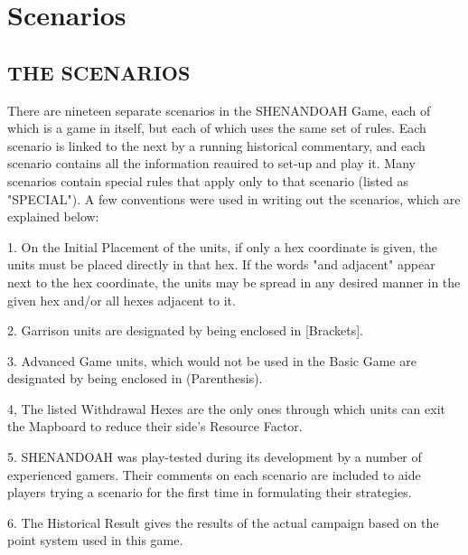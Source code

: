 \section{Scenarios}

\subsection*{THE SCENARIOS}

There are nineteen separate scenarios in the SHENANDOAH Game, each of which is
a game in itself, but each of which uses the same set of rules. Each scenario
is linked to the next by a running historical commentary, and each scenario
contains all the information reauired to set-up and play it. Many scenarios
contain special rules that apply only to that scenario (listed as "SPECIAL"). A
few conventions were used in writing out the scenarios, which are explained
below:

1. On the Initial Placement of the units, if only a hex coordinate is given,
the units must be placed directly in that hex. If the words "and adjacent"
appear next to the hex coordinate, the units may be spread in any desired
manner in the given hex and/or all hexes adjacent to it.

2. Garrison units are designated by being enclosed in [Brackets].

3. Advanced Game units, which would not be used in the Basic Game are
designated by being enclosed in (Parenthesis).

4, The listed Withdrawal Hexes are the only ones through which units can exit
the Mapboard to reduce their side's Resource Factor.

5. SHENANDOAH was play-tested during its development by a number of experienced
gamers. Their comments on each scenario are included to aide players trying a
scenario for the first time in formulating their strategies.

6. The Historical Result gives the results of the actual campaign based on the
point system used in this game.




